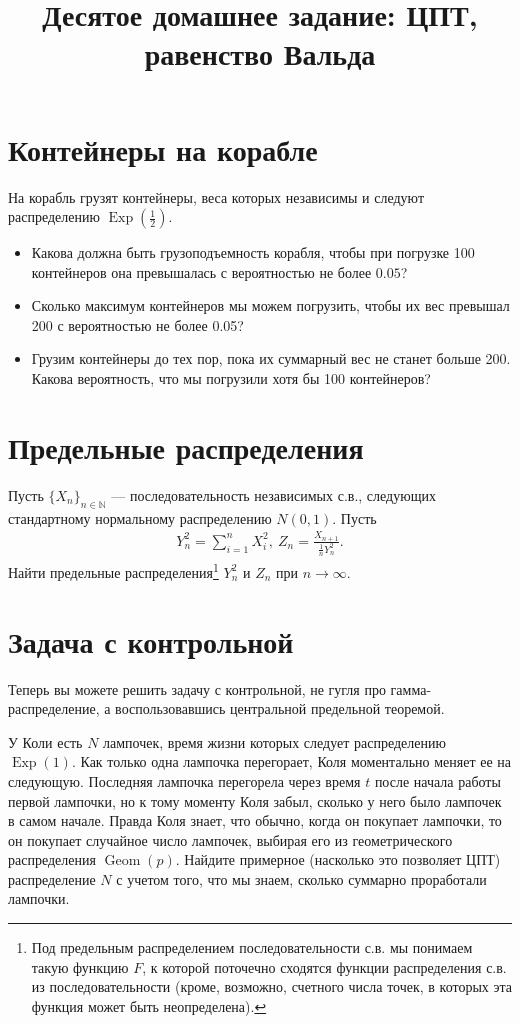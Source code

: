 \documentclass[12pt]{article}
\title{Десятое домашнее задание: ЦПТ, равенство Вальда}
\newcommand\N{\mathbb{N}}
\DeclareMathOperator{\Geom}{Geom}
\DeclareMathOperator{\Exp}{Exp}
\begin{document}
\maketitle

\section{Контейнеры на корабле}

На корабль грузят контейнеры, веса которых независимы и следуют распределению $\Exp(\frac{1}{2})$. 
\begin{itemize}
    \item Какова должна быть грузоподъемность корабля, чтобы при погрузке 100 контейнеров она превышалась с вероятностью не более $0.05$?
    \item Сколько максимум контейнеров мы можем погрузить, чтобы их вес превышал 200 с вероятностью не более 0.05?
    \item Грузим контейнеры до тех пор, пока их суммарный вес не станет больше 200. Какова вероятность, что мы погрузили хотя бы 100 контейнеров?
\end{itemize}

\section{Предельные распределения}

Пусть $\{X_n\}_{n \in \N}$ --- последовательность независимых с.в., следующих стандартному нормальному распределению $N(0, 1)$. Пусть
\begin{align*}
    Y_n^2 = \sum_{i = 1}^n X_i^2, \ Z_n = \frac{X_{n + 1}}{\frac{1}{n}Y_n^2}.
\end{align*}
Найти предельные распределения\footnote{Под предельным распределением последовательности с.в. мы понимаем такую функцию $F$, к которой поточечно сходятся функции распределения с.в. из последовательности (кроме, возможно, счетного числа точек, в которых эта функция может быть неопределена).} $Y_n^2$ и $Z_n$ при $n \to \infty$.

\section{Задача с контрольной}
Теперь вы можете решить задачу с контрольной, не гугля про гамма-распределение, а воспользовавшись центральной предельной теоремой. 

У Коли есть $N$ лампочек, время жизни которых следует распределению $\Exp(1)$. Как только одна лампочка перегорает, Коля моментально меняет ее на следующую. Последняя лампочка перегорела через время $t$ после начала работы первой лампочки, но к тому моменту Коля забыл, сколько у него было лампочек в самом начале. Правда Коля знает, что обычно, когда он покупает лампочки, то он покупает случайное число лампочек, выбирая его из геометрического распределения $\Geom(p)$. Найдите примерное (насколько это позволяет ЦПТ) распределение $N$ с учетом того, что мы знаем, сколько суммарно проработали лампочки. 
\end{document}
